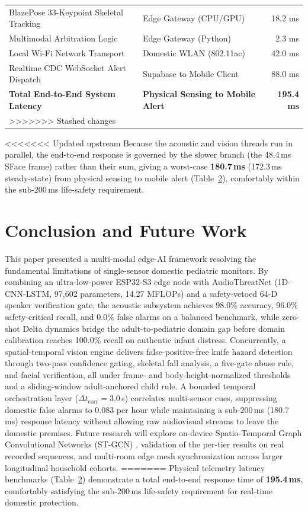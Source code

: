 \documentclass[conference]{IEEEtran}
\begin{document}
\begin{table}[htbp]
\begin{table}[htbp]
{\begin{tabular}{llr}
BlazePose 33-Keypoint Skeletal Tracking & Edge Gateway (CPU/GPU) & 18.2 ms \\
Multimodal Arbitration Logic & Edge Gateway (Python) & 2.3 ms \\
Local Wi-Fi Network Transport & Domestic WLAN (802.11ac) & 42.0 ms \\
Realtime CDC WebSocket Alert Dispatch & Supabase to Mobile Client & 88.0 ms \\
\midrule
\textbf{Total End-to-End System Latency} & \textbf{Physical Sensing to Mobile Alert} & \textbf{195.4 ms} \\
>>>>>>> Stashed changes
\bottomrule
\end{tabular}
}
\label{tab6}
\end{table}

<<<<<<< Updated upstream
Because the acoustic and vision threads run in parallel, the end-to-end response is governed by the slower branch (the 48.4\,ms SFace frame) rather than their sum, giving a worst-case \textbf{180.7\,ms} (172.3\,ms steady-state) from physical sensing to mobile alert (Table~\ref{tab6}), comfortably within the sub-200\,ms life-safety requirement.

\section{Conclusion and Future Work}
This paper presented a multi-modal edge-AI framework resolving the fundamental limitations of single-sensor domestic pediatric monitors. By combining an ultra-low-power ESP32-S3 edge node with AudioThreatNet (1D-CNN-LSTM, 97,602 parameters, 14.27 MFLOPs) and a safety-vetoed 64-D speaker verification gate, the acoustic subsystem achieves 98.0\% accuracy, 96.0\% safety-critical recall, and 0.0\% false alarms on a balanced benchmark, while zero-shot Delta dynamics bridge the adult-to-pediatric domain gap before domain calibration reaches 100.0\% recall on authentic infant distress. Concurrently, a spatial-temporal vision engine delivers false-positive-free knife hazard detection through two-pass confidence gating, skeletal fall analysis, a five-gate abuse rule, and facial verification, all under frame- and body-height-normalized thresholds and a sliding-window adult-anchored child rule. A bounded temporal orchestration layer ($\Delta t_{\text{corr}} = 3.0$\,s) correlates multi-sensor cues, suppressing domestic false alarms to 0.083 per hour while maintaining a sub-200\,ms (180.7\,ms) response latency without allowing raw audiovisual streams to leave the domestic premises. Future research will explore on-device Spatio-Temporal Graph Convolutional Networks (ST-GCN) \cite{b16}, validation of the per-tier results on real recorded sequences, and multi-room edge mesh synchronization across larger longitudinal household cohorts.
=======
Physical telemetry latency benchmarks (Table~\ref{tab6}) demonstrate a total end-to-end response time of \textbf{195.4\,ms}, comfortably satisfying the sub-200\,ms life-safety requirement for real-time domestic protection.


\end{table}
\end{document}
